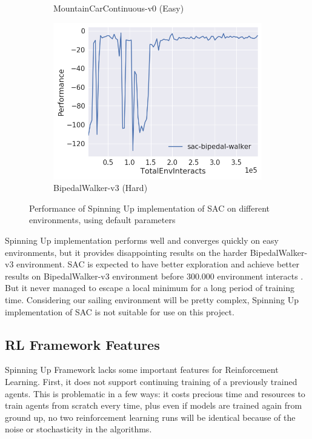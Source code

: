 \documentclass[12pt,twoside]{report}
\begin{document}
\begin{figure}[h]
\begin{subfigure}[t]{0.32\textwidth}
         \caption{MountainCarContinuous-v0 (Easy)}
     \end{subfigure}
     \hfill
     \begin{subfigure}[t]{0.32\textwidth}
         \centering
         \includegraphics[width=\textwidth]{figures/rl-framework/sac-bipedal-walker.png}
         \caption{BipedalWalker-v3 (Hard)}
     \end{subfigure}
        \caption{Performance of Spinning Up implementation of SAC on different environments, using default parameters}
        \label{fig:spinup-SAC}
\end{figure}

Spinning Up implementation performs well and converges quickly on easy environments, but it provides disappointing results on the harder BipedalWalker-v3 environment. SAC is expected to have better exploration and achieve better results on BipedalWalker-v3 environment before 300.000 environment interacts \cite{gym-leaderboard}. But it never managed to escape a local minimum for a long period of training time. Considering our sailing environment will be pretty complex, Spinning Up implementation of SAC is not suitable for use on this project.

\bigskip
\subsection{RL Framework Features} \label{RLF:framework-features}

Spinning Up Framework lacks some important features for Reinforcement Learning. First, it does not support continuing training of a previously trained agents. This is problematic in a few ways: it costs precious time and resources to train agents from scratch every time, plus even if models are trained again from ground up, no two reinforcement learning runs will be identical because of the noise or stochasticity in the algorithms.
\end{document}

